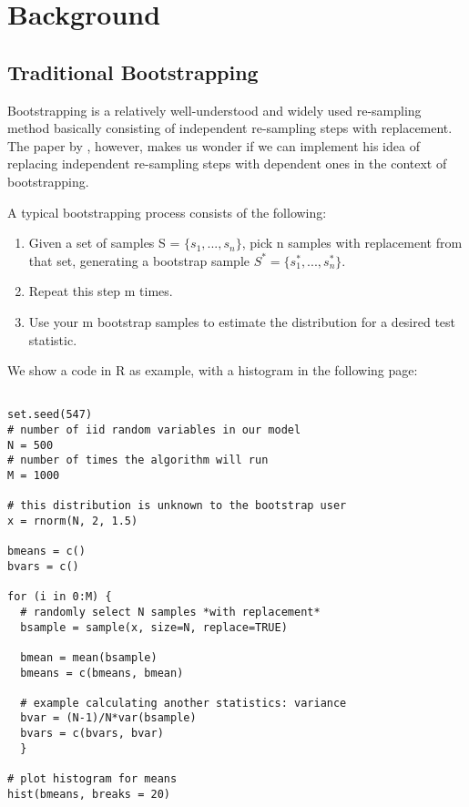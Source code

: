 

\section{Background}

\subsection{Traditional Bootstrapping}
Bootstrapping is a relatively well-understood and widely used re-sampling method basically consisting of independent re-sampling steps with replacement. The paper by %
 \Peskun, however, makes us wonder if we can implement his idea of replacing independent re-sampling steps with dependent ones in the context of bootstrapping.

A typical bootstrapping process consists of the following:

\begin{enumerate}[label=\alph*)]
\item Given a set of samples S = $\{s_1, ..., s_n\}$, pick n samples with replacement from that set, generating a bootstrap sample $S^* = \{s^*_1, ..., s^*_n\}$.

\item Repeat this step m times.

\item Use your m bootstrap samples to estimate the distribution for a desired test statistic.
\end{enumerate}

We show a code in R as example, with a histogram in the following page:


\begin{lstlisting}

set.seed(547)
# number of iid random variables in our model
N = 500
# number of times the algorithm will run 
M = 1000 

# this distribution is unknown to the bootstrap user
x = rnorm(N, 2, 1.5)

bmeans = c()
bvars = c()

for (i in 0:M) {
  # randomly select N samples *with replacement* 
  bsample = sample(x, size=N, replace=TRUE) 
  
  bmean = mean(bsample)
  bmeans = c(bmeans, bmean)
  
  # example calculating another statistics: variance
  bvar = (N-1)/N*var(bsample)
  bvars = c(bvars, bvar)
  }

# plot histogram for means
hist(bmeans, breaks = 20)
\end{lstlisting}

